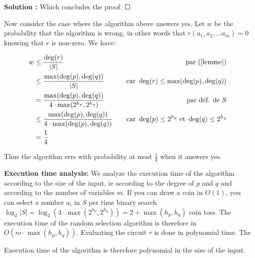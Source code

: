 \documentclass[11pt]{article} %
\newenvironment{solution}[1][\unskip]{%
	\par
	\noindent
	\textbf{Solution #1:}
	\noindent}
{\medskip}
\begin{document}
\begin{solution}
		Which concludes the proof. $ \Square $

		Now consider the case where the algorithm above answers yes. Let $ w $ be the probability that the algorithm is wrong, in other words that $ r (a_1, a_2, ... a_m) = 0 $ knowing that $ r $ is non-zero. We have:

		\begin{align*}
		w &\leq \frac{\deg(r)}{|S|} \quad &\text{par (\ref{lemme})}\\
		&\leq \frac{\max(\deg(p),\deg(q))}{|S|} \quad & \text{car }\deg(r)\leq \max(\deg(p),\deg(q))\\
		&= \frac{\max(\deg(p),\deg(q))}{4\cdot \max(2^{h_p},2^{h_q})} \quad & \text{par déf. de }S\\
		&\leq \frac{\max(\deg(p),\deg(q))}{4\cdot \max(\deg(p),\deg(q))}\quad & \text{car }\deg(p)\leq 2^{h_p} \text{ et } \deg(q) \leq 2^{h_q}\\
		&=\frac{1}{4}
		\end{align*}

		Thus the algorithm errs with probability at most $ \frac {1} {4} $ when it answers yes.

		\textbf {Execution time analysis:} We analyze the execution time of the algorithm according to the size of the input, ie according to the degree of $ p $ and $ q $ and according to the number of variables $ m $. If you can draw a coin in $ O (1) $, you can select a number $ a_i $ in $ S $ per time binary search $ \log_2 | S | = \log_2 (4 \cdot \max (2 ^ {h_p}, 2 ^ {h_q})) = 2+ \max (h_p, h_q) $ coin toss. The execution time of the random selection algorithm is therefore in $ O (m \cdot \max (h_p, h_q)) $. Evaluating the circuit $ r $ is done in polynomial time. The

		Execution time of the algorithm is therefore polynomial in the size of the input.
	\end{solution}
	
\end{document}
